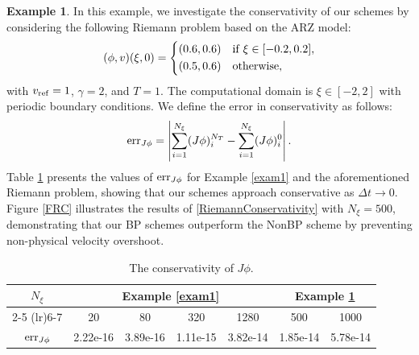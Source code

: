 \documentclass[times,final,11pt]{elsarticle}
\numberwithin{equation}{section}
\theoremstyle{definition}
\newtheorem{exa}[remark]{Example}
\theoremstyle{remark}
\begin{document}
\begin{exa} \label{exam2}
	In this example, we investigate the conservativity of our schemes by considering the following Riemann problem based on the ARZ model:
	\begin{equation}
	\label{RiemannConservativity}
	    (\phi, v)(\xi, 0) = \left\{
	    \begin{aligned}
	        &(0.6, 0.6) \quad {\rm if} \; \xi \in [-0.2, 0.2], \\
	        &(0.5, 0.6) \quad {\rm otherwise}, 
	    \end{aligned}
	    \right.
	\end{equation}
	with $v_{\rm ref} = 1$, $\gamma = 2$, and $T = 1$. The computational domain is $\xi \in [-2, 2]$ with periodic boundary conditions. We define the error in conservativity as follows:
	\begin{equation*}
	\label{consereq}
	    {\rm err}_{J\phi} = \left\vert \sum_{i = 1}^{N_\xi} (J\phi)_i^{N_T} - \sum_{i = 1}^{N_\xi} (J\phi)_i^{0} \right\vert.
	\end{equation*}
	Table \ref{TRC} presents the values of ${\rm err}_{J\phi}$ for Example \ref{exam1} and the aforementioned Riemann problem, showing that our schemes approach conservative as $\Delta t \rightarrow 0$. Figure \ref{FRC} illustrates the results of \eqref{RiemannConservativity} with $N_\xi = 500$, demonstrating that our BP schemes outperform the NonBP scheme by preventing non-physical velocity overshoot.

	\begin{table}[h!]
		\renewcommand\arraystretch{1.2}
		\centering
		\caption{\sf The conservativity of $J\phi$.}
		\begin{tabular}{c cccc cc}
			
			\toprule[1.5pt]
			
			\multirow{2}{*}{$N_\xi$} & \multicolumn{4}{c}{Example \ref{exam1}} & \multicolumn{2}{c}{Example \ref{exam2}} \\
			
			\cmidrule(lr){2-5} \cmidrule(lr){6-7}
			
			& 20 & 80 & 320 & 1280 & 500 & 1000 \\
			
			\midrule[1.5pt]
			
			${\rm err}_{J\phi}$ & 2.22e-16 & 3.89e-16 & 1.11e-15 & 3.82e-14 & 1.85e-14 & 5.78e-14 \\ 
			
			\bottomrule[1.5pt]
			
		\end{tabular}
		\label{TRC}
	\end{table}
	 

\end{exa}
\end{document}

